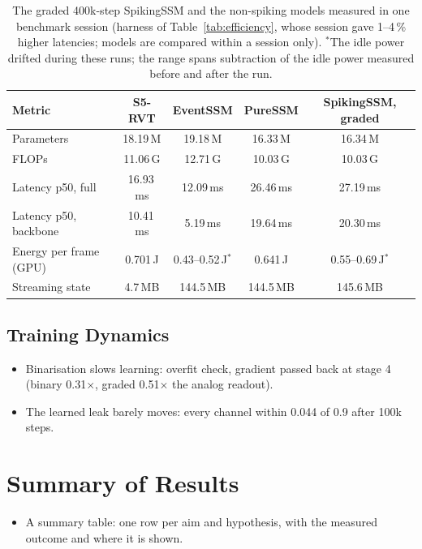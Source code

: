 \documentclass[11pt, a4paper]{report}
\begin{document}
\begin{table}[htbp]
\centering
\caption{The graded 400k-step SpikingSSM and the non-spiking models measured in one benchmark session
(harness of Table~\ref{tab:efficiency}, whose session gave 1--4\,\% higher latencies; models are compared within
a session only). $^{*}$The idle power drifted during these runs; the range spans subtraction of the idle power
measured before and after the run.}
\label{tab:spiking_bench}
\begin{tabular}{lcccc}
\toprule
\textbf{Metric} & \textbf{S5-RVT} & \textbf{EventSSM} & \textbf{PureSSM} & \textbf{SpikingSSM, graded} \\
\midrule
Parameters              & 18.19\,M & 19.18\,M & 16.33\,M & 16.34\,M \\
FLOPs                   & 11.06\,G & 12.71\,G & 10.03\,G & 10.03\,G \\
Latency p50, full       & 16.93\,ms & 12.09\,ms & 26.46\,ms & 27.19\,ms \\
Latency p50, backbone   & 10.41\,ms & 5.19\,ms & 19.64\,ms & 20.30\,ms \\
Energy per frame (GPU)  & 0.701\,J & 0.43--0.52\,J$^{*}$ & 0.641\,J & 0.55--0.69\,J$^{*}$ \\
Streaming state         & 4.7\,MB & 144.5\,MB & 144.5\,MB & 145.6\,MB \\
\bottomrule
\end{tabular}
\end{table}

\subsection{Training Dynamics}
\label{subsec:spk_dynamics}
\begin{itemize}
  \item Binarisation slows learning: overfit check, gradient passed back at stage 4 (binary 0.31$\times$, graded 0.51$\times$ the analog readout).
  \item The learned leak barely moves: every channel within 0.044 of 0.9 after 100k steps.
\end{itemize}

\section{Summary of Results}
\begin{itemize}
  \item A summary table: one row per aim and hypothesis, with the measured outcome and where it is shown.
\end{itemize}
\end{document}
